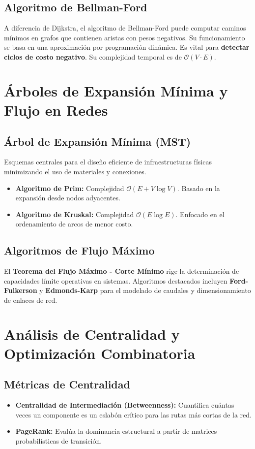 \documentclass[11pt,letterpaper]{article}
\begin{document}
\subsection{Algoritmo de Bellman-Ford}
A diferencia de Dijkstra, el algoritmo de Bellman-Ford puede computar caminos mínimos en grafos que contienen aristas con pesos negativos. Su funcionamiento se basa en una aproximación por programación dinámica. Es vital para \textbf{detectar ciclos de costo negativo}. Su complejidad temporal es de $\mathcal{O}(V \cdot E)$.

\section{Árboles de Expansión Mínima y Flujo en Redes}

\subsection{Árbol de Expansión Mínima (MST)}
Esquemas centrales para el diseño eficiente de infraestructuras físicas minimizando el uso de materiales y conexiones.
\begin{itemize}
    \item \textbf{Algoritmo de Prim:} Complejidad $\mathcal{O}(E + V \log V)$. Basado en la expansión desde nodos adyacentes.
    \item \textbf{Algoritmo de Kruskal:} Complejidad $\mathcal{O}(E \log E)$. Enfocado en el ordenamiento de arcos de menor costo.
\end{itemize}

\subsection{Algoritmos de Flujo Máximo}
El \textbf{Teorema del Flujo Máximo - Corte Mínimo} rige la determinación de capacidades límite operativas en sistemas. Algoritmos destacados incluyen \textbf{Ford-Fulkerson} y \textbf{Edmonds-Karp} para el modelado de caudales y dimensionamiento de enlaces de red.

\section{Análisis de Centralidad y Optimización Combinatoria}
\subsection{Métricas de Centralidad}
\begin{itemize}
    \item \textbf{Centralidad de Intermediación (Betweenness):} Cuantifica cuántas veces un componente es un eslabón crítico para las rutas más cortas de la red.
    \item \textbf{PageRank:} Evalúa la dominancia estructural a partir de matrices probabilísticas de transición.
\end{itemize}
\end{document}
